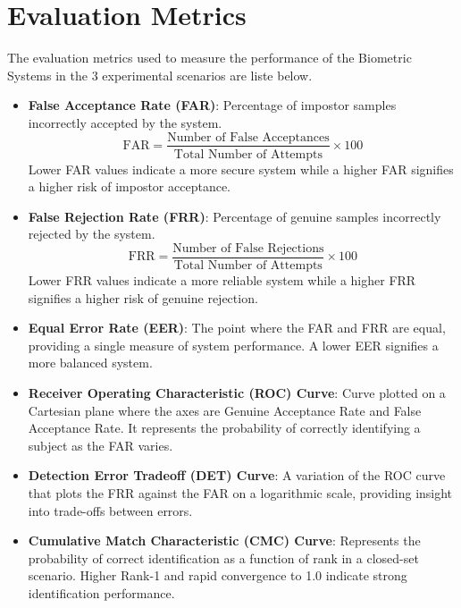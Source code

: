\section{Evaluation Metrics}
The evaluation metrics used to measure the performance of the Biometric Systems in the 3 experimental scenarios are liste below.

\begin{itemize}

    \item \textbf{False Acceptance Rate (FAR)}:  
    Percentage of impostor samples incorrectly accepted by the system.  
    \[
    \text{FAR} = \frac{\text{Number of False Acceptances}}{\text{Total Number of Attempts}} \times 100
    \]
    Lower FAR values indicate a more secure system while a higher FAR signifies a higher risk of impostor acceptance.
    
    \item \textbf{False Rejection Rate (FRR)}:  
    Percentage of genuine samples incorrectly rejected by the system.  
    \[
    \text{FRR} = \frac{\text{Number of False Rejections}}{\text{Total Number of Attempts}} \times 100
    \]
    Lower FRR values indicate a more reliable system while a higher FRR signifies a higher risk of genuine rejection.

    \item \textbf{Equal Error Rate (EER)}:  
    The point where the FAR and FRR are equal, providing a single measure of system performance.  
    A lower EER signifies a more balanced system.

    \item \textbf{Receiver Operating Characteristic (ROC) Curve}:  
    Curve plotted on a Cartesian plane where the axes are Genuine Acceptance Rate and False Acceptance Rate. It represents the probability of correctly identifying a subject as the FAR varies.

    \item \textbf{Detection Error Tradeoff (DET) Curve}:  
    A variation of the ROC curve that plots the FRR against the FAR on a logarithmic scale, providing insight into trade-offs between errors.

    \item \textbf{Cumulative Match Characteristic (CMC) Curve}:  
    Represents the probability of correct identification as a function of rank in a closed-set scenario. Higher Rank-1 and rapid convergence to 1.0 indicate strong identification performance.


\end{itemize}
